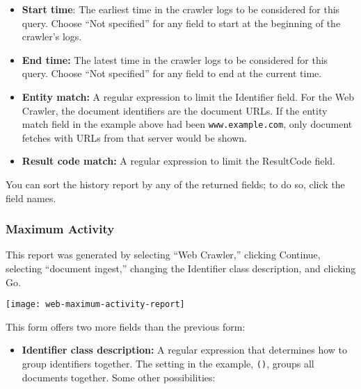 \begin{changemargin}{1.5in}{0in}
\begin{itemize}
\item \textbf{Start time}: The earliest time in the crawler logs to be
considered for this query.  Choose ``Not specified'' for any field to
start at the beginning of the crawler's logs.

\item \textbf{End time:} The latest time in the crawler logs to be
considered for this query. Choose ``Not specified'' for any field 
to end at the current time.

\item \textbf{Entity match:} A regular expression to limit the
Identifier field. For the Web Crawler, the document identifiers are
the document URLs. If the entity match field in the example above had
been \texttt{www.example.com}, only document fetches with URLs from
that server would be shown.

\item \textbf{Result code match:} A regular expression to limit the
ResultCode field.

\end{itemize}

You can sort the history report by any of the returned fields; to do so,
click the field names.


\subsubsection{Maximum Activity}

This report was generated by selecting ``Web Crawler,''
clicking Continue, selecting ``document ingest,'' changing the Identifier
class description, and clicking Go.

\texttt{[image: web-maximum-activity-report]}

This form offers two more fields than the previous form:

\begin{itemize}

\item \textbf{Identifier class description:} A regular expression that
determines how to group identifiers together. The setting in the example,
\texttt{()}, groups all documents together. Some other possibilities:


\end{itemize}
\end{changemargin}
